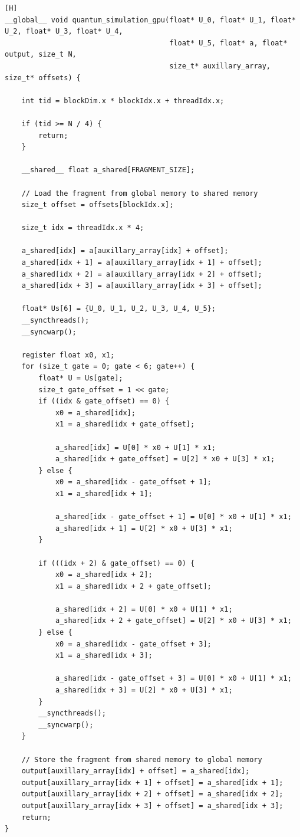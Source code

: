 \documentclass{article}
\begin{document}
\begin{verbatim}[H]
__global__ void quantum_simulation_gpu(float* U_0, float* U_1, float* U_2, float* U_3, float* U_4,
                                       float* U_5, float* a, float* output, size_t N,
                                       size_t* auxillary_array, size_t* offsets) {

    int tid = blockDim.x * blockIdx.x + threadIdx.x;

    if (tid >= N / 4) {
        return;
    }

    __shared__ float a_shared[FRAGMENT_SIZE];

    // Load the fragment from global memory to shared memory
    size_t offset = offsets[blockIdx.x];

    size_t idx = threadIdx.x * 4;

    a_shared[idx] = a[auxillary_array[idx] + offset];
    a_shared[idx + 1] = a[auxillary_array[idx + 1] + offset];
    a_shared[idx + 2] = a[auxillary_array[idx + 2] + offset];
    a_shared[idx + 3] = a[auxillary_array[idx + 3] + offset];

    float* Us[6] = {U_0, U_1, U_2, U_3, U_4, U_5};
    __syncthreads();
    __syncwarp();

    register float x0, x1;
    for (size_t gate = 0; gate < 6; gate++) {
        float* U = Us[gate];
        size_t gate_offset = 1 << gate;
        if ((idx & gate_offset) == 0) {
            x0 = a_shared[idx];
            x1 = a_shared[idx + gate_offset];

            a_shared[idx] = U[0] * x0 + U[1] * x1;
            a_shared[idx + gate_offset] = U[2] * x0 + U[3] * x1;
        } else {
            x0 = a_shared[idx - gate_offset + 1];
            x1 = a_shared[idx + 1];

            a_shared[idx - gate_offset + 1] = U[0] * x0 + U[1] * x1;
            a_shared[idx + 1] = U[2] * x0 + U[3] * x1;
        }

        if (((idx + 2) & gate_offset) == 0) {
            x0 = a_shared[idx + 2];
            x1 = a_shared[idx + 2 + gate_offset];

            a_shared[idx + 2] = U[0] * x0 + U[1] * x1;
            a_shared[idx + 2 + gate_offset] = U[2] * x0 + U[3] * x1;
        } else {
            x0 = a_shared[idx - gate_offset + 3];
            x1 = a_shared[idx + 3];

            a_shared[idx - gate_offset + 3] = U[0] * x0 + U[1] * x1;
            a_shared[idx + 3] = U[2] * x0 + U[3] * x1;
        }
        __syncthreads();
        __syncwarp();
    }

    // Store the fragment from shared memory to global memory
    output[auxillary_array[idx] + offset] = a_shared[idx];
    output[auxillary_array[idx + 1] + offset] = a_shared[idx + 1];
    output[auxillary_array[idx + 2] + offset] = a_shared[idx + 2];
    output[auxillary_array[idx + 3] + offset] = a_shared[idx + 3];
    return;
}
\end{verbatim}
\end{document}
